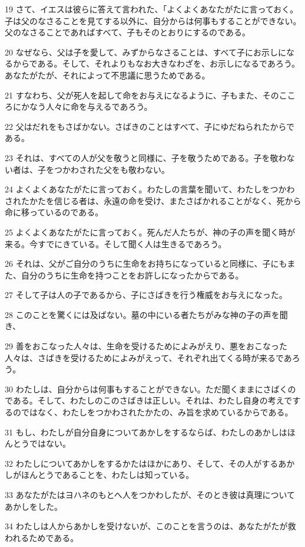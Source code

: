 \par 19 さて、イエスは彼らに答えて言われた、「よくよくあなたがたに言っておく。子は父のなさることを見てする以外に、自分からは何事もすることができない。父のなさることであればすべて、子もそのとおりにするのである。
\par 20 なぜなら、父は子を愛して、みずからなさることは、すべて子にお示しになるからである。そして、それよりもなお大きなわざを、お示しになるであろう。あなたがたが、それによって不思議に思うためである。
\par 21 すなわち、父が死人を起して命をお与えになるように、子もまた、そのこころにかなう人々に命を与えるであろう。
\par 22 父はだれをもさばかない。さばきのことはすべて、子にゆだねられたからである。
\par 23 それは、すべての人が父を敬うと同様に、子を敬うためである。子を敬わない者は、子をつかわされた父をも敬わない。
\par 24 よくよくあなたがたに言っておく。わたしの言葉を聞いて、わたしをつかわされたかたを信じる者は、永遠の命を受け、またさばかれることがなく、死から命に移っているのである。
\par 25 よくよくあなたがたに言っておく。死んだ人たちが、神の子の声を聞く時が来る。今すでにきている。そして聞く人は生きるであろう。
\par 26 それは、父がご自分のうちに生命をお持ちになっていると同様に、子にもまた、自分のうちに生命を持つことをお許しになったからである。
\par 27 そして子は人の子であるから、子にさばきを行う権威をお与えになった。
\par 28 このことを驚くには及ばない。墓の中にいる者たちがみな神の子の声を聞き、
\par 29 善をおこなった人々は、生命を受けるためによみがえり、悪をおこなった人々は、さばきを受けるためによみがえって、それぞれ出てくる時が来るであろう。
\par 30 わたしは、自分からは何事もすることができない。ただ聞くままにさばくのである。そして、わたしのこのさばきは正しい。それは、わたし自身の考えでするのではなく、わたしをつかわされたかたの、み旨を求めているからである。
\par 31 もし、わたしが自分自身についてあかしをするならば、わたしのあかしはほんとうではない。
\par 32 わたしについてあかしをするかたはほかにあり、そして、その人がするあかしがほんとうであることを、わたしは知っている。
\par 33 あなたがたはヨハネのもとへ人をつかわしたが、そのとき彼は真理についてあかしをした。
\par 34 わたしは人からあかしを受けないが、このことを言うのは、あなたがたが救われるためである。
